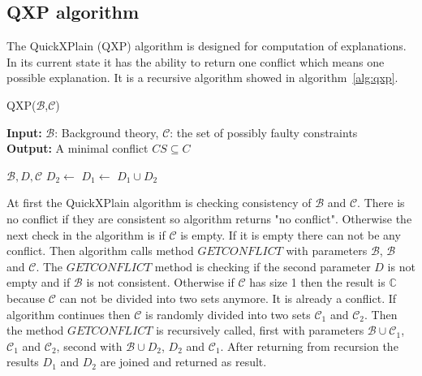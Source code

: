 \documentclass[12pt,a4paper]{article}
\begin{document}
\subsection{QXP algorithm}

The QuickXPlain (QXP) algorithm is designed for computation of explanations. In its current state it has the ability to return one conflict which means one possible explanation. It is a recursive algorithm showed in algorithm~\ref{alg:qxp}.

\begin{algorithm}[H]
	\footnotesize
	\caption{QXP($\mathcal{B}$,$\mathcal{C}$)}
	\label{alg:qxp}
	\textbf{Input:} $\mathcal{B}$: Background theory, $\mathcal{C}$: the set of possibly faulty constraints  \\
	\textbf{Output:} A minimal conflict $CS \subseteq C$
	\begin{algorithmic}[1]
		\State {}
		\State \Return {$\emptyset$}
		\EndIf
		\State {}
		
		\medskip
		 {$\mathcal{B}, D, \mathcal{C}$}
		\State \Return {$\emptyset$}
		\EndIf
		\State {}
		\EndIf
		\State $D_{2} \gets$ 
		\State $D_{1} \gets$ 
		\State \Return $D_{1} \cup D_{2}$
		\EndFunction			
	\end{algorithmic}
\end{algorithm}

At first the QuickXPlain algorithm is checking consistency of $\mathcal{B}$ and $\mathcal{C}$. There is no conflict if they are consistent so algorithm returns "no conflict". Otherwise the next check in the algorithm is if $\mathcal{C}$ is empty. If it is empty there can not be any conflict. Then algorithm calls method $\mathit{GETCONFLICT}$ with parameters $\mathcal{B}$, $\mathcal{B}$ and $\mathcal{C}$. The $\mathit{GETCONFLICT}$ method is checking if the second parameter $D$ is not empty and if $\mathcal{B}$ is not consistent. Otherwise if $\mathcal{C}$ has size 1 then the result is $\mathbb{C}$ because $\mathcal{C}$ can not be divided into two sets anymore. It is already a conflict. If algorithm continues then $\mathcal{C}$ is randomly divided into two sets $\mathcal{C}_{1}$ and $\mathcal{C}_{2}$. Then the method $\mathit{GETCONFLICT}$ is recursively called, first with parameters $\mathcal{B} \cup \mathcal{C}_{1}$, $\mathcal{C}_{1}$ and $\mathcal{C_{2}}$, second with $\mathcal{B} \cup D_{2}$, $D_{2}$ and $\mathcal{C}_{1}$. After returning from recursion the results $D_{1}$ and $D_{2}$ are joined and returned as result.
\end{document}
